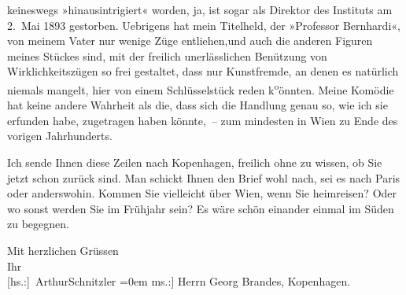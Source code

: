                keineswegs »hinausintrigiert« worden, ja,  ist
               sogar als Direktor des Instituts
               am 2. Mai 1893 gestorben. Uebrigens hat mein Titelheld, der »Professor Bernhardi«, von
               meinem Vater nur wenige Züge
               entliehen,und auch die anderen Figuren meines Stückes sind, mit der freilich
               unerlässlichen Benützung von Wirklichkeitszügen so frei gestaltet, dass nur
               Kunstfremde, an denen es natürlich {\pb}niemals
               mangelt, hier von einem Schlüsselstück reden k\substVorne{}\textsuperscript{o}\substDazwischen{}ö\substHinten{}nnten. Meine Komödie
               hat keine andere Wahrheit als die, dass sich die Handlung genau so, wie ich sie
                  erfunden\strikeout{,} habe, zugetragen haben könnte, – zum
               mindesten in Wien zu Ende des vorigen
               Jahrhunderts.\pend
           
\pstart
           Ich sende Ihnen diese Zeilen nach Kopenhagen,
               freilich ohne zu wissen, ob Sie jetzt schon zurück sind. Man schickt Ihnen den Brief
               wohl nach, sei es nach Paris oder anderswohin.
               Kommen Sie vielleicht über Wien, wenn Sie
               heimreisen? Oder wo sonst werden Sie im Frühjahr sein? Es wäre schön einander einmal
               im Süden zu begegnen.\pend
           
\pstart
           Mit herzlichen Grüssen{\\[\baselineskip]}Ihr{\\[\baselineskip]}\spacefill\mbox{{[}hs.:{]} ArthurSchnitzler}\pend
           \leftskip=0em{}
\pstart
           \noindent{}{[}ms.:{]} Herrn Georg Brandes, Kopenhagen.\pend
           \endnumbering{}  
      